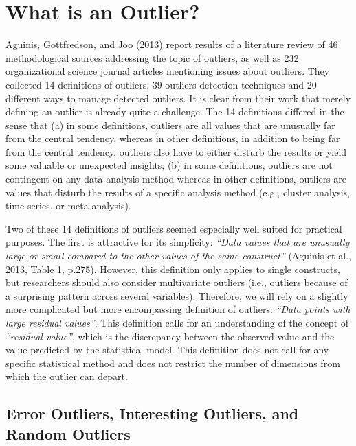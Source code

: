 \documentclass[man,floatsintext]{apa6}
\begin{document}
\hypertarget{what-is-an-outlier}{%
\section{What is an Outlier?}\label{what-is-an-outlier}}

Aguinis, Gottfredson, and Joo (2013) report results of a literature review of 46 methodological sources addressing the topic of outliers, as well as 232 organizational science journal articles mentioning issues about outliers. They collected 14 definitions of outliers, 39 outliers detection techniques and 20 different ways to manage detected outliers. It is clear from their work that merely defining an outlier is already quite a challenge. The 14 definitions differed in the sense that (a) in some definitions, outliers are all values that are unusually far from the central tendency, whereas in other definitions, in addition to being far from the central tendency, outliers also have to either disturb the results or yield some valuable or unexpected insights; (b) in some definitions, outliers are not contingent on any data analysis method whereas in other definitions, outliers are values that disturb the results of a specific analysis method (e.g., cluster analysis, time series, or meta-analysis).

Two of these 14 definitions of outliers seemed especially well suited for practical purposes. The first is attractive for its simplicity: \emph{\enquote{Data values that are unusually large or small compared to the other values of the same construct}} (Aguinis et al., 2013, Table 1, p.275). However, this definition only applies to single constructs, but researchers should also consider multivariate outliers (i.e., outliers because of a surprising pattern across several variables). Therefore, we will rely on a slightly more complicated but more encompassing definition of outliers: \emph{\enquote{Data points with large residual values}}. This definition calls for an understanding of the concept of \emph{\enquote{residual value}}, which is the discrepancy between the observed value and the value predicted by the statistical model. This definition does not call for any specific statistical method and does not restrict the number of dimensions from which the outlier can depart.

\hypertarget{error-outliers-interesting-outliers-and-random-outliers}{%
\subsection{Error Outliers, Interesting Outliers, and Random Outliers}\label{error-outliers-interesting-outliers-and-random-outliers}}
\end{document}

